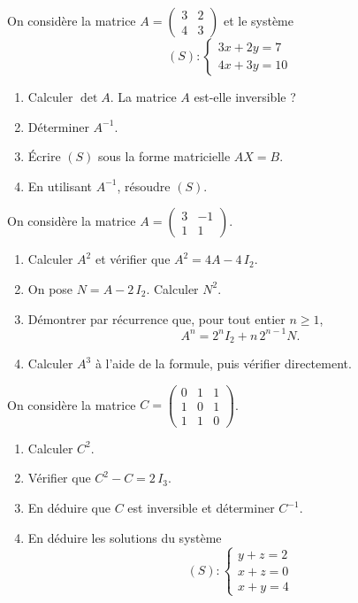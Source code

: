 On considère la matrice $A = \begin{pmatrix}3&2\\4&3\end{pmatrix}$ et le
système
$$
(S) : \begin{cases} 3x + 2y = 7 \\ 4x + 3y = 10 \end{cases}
$$
\begin{enumerate}
	\item Calculer $\det A$. La matrice $A$ est-elle inversible ?
	\item Déterminer $A^{-1}$.
	\item Écrire $(S)$ sous la forme matricielle $AX = B$.
	\item En utilisant $A^{-1}$, résoudre $(S)$.
\end{enumerate}

On considère la matrice $A = \begin{pmatrix}3&-1\\1&1\end{pmatrix}$.
\begin{enumerate}
	\item Calculer $A^2$ et vérifier que $A^2 = 4A - 4\,I_2$.
	\item On pose $N = A - 2\,I_2$. Calculer $N^2$.
	\item Démontrer par récurrence que, pour tout entier $n \geqslant 1$,
	$$
	A^n = 2^n I_2 + n\,2^{n-1} N.
	$$
	\item Calculer $A^3$ à l'aide de la formule, puis vérifier directement.
\end{enumerate}

On considère la matrice $C = \begin{pmatrix}0&1&1\\1&0&1\\1&1&0\end{pmatrix}$.
\begin{enumerate}
	\item Calculer $C^2$.
	\item Vérifier que $C^2 - C = 2\,I_3$.
	\item En déduire que $C$ est inversible et déterminer $C^{-1}$.
	\item En déduire les solutions du système
	$$
	(S) : \begin{cases} y + z = 2 \\ x + z = 0 \\ x + y = 4 \end{cases}
	$$
\end{enumerate}

